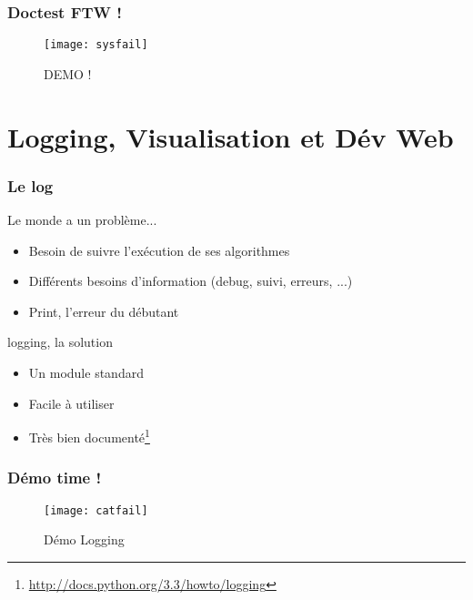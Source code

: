 \documentclass{beamer}
\begin{document}
\begin{frame}
  \frametitle{Doctest FTW !}

  \begin{figure}[!h]
    \centering
    \texttt{[image: sysfail]}
    \caption{DEMO !}
    \label{fig:doctestdemo}
  \end{figure}
\end{frame}


\section{Logging, Visualisation et Dév Web}
\label{sec:libraries}

\begin{frame}
  \frametitle{Le log}

  \begin{block}{Le monde a un problème...}
    \begin{itemize}
    \item Besoin de suivre l'exécution de ses algorithmes
    \item Différents besoins d'information (debug, suivi, erreurs,
      ...)
    \item Print, l'erreur du débutant
    \end{itemize}
  \end{block}

  \begin{block}{logging, la solution}
    \begin{itemize}
    \item Un module standard
    \item Facile à utiliser
    \item Très bien documenté\footnote{\url{http://docs.python.org/3.3/howto/logging}}
    \end{itemize}
  \end{block}
\end{frame}

\begin{frame}
  \frametitle{Démo time !}
  \begin{figure}[!h]
    \centering
    \texttt{[image: catfail]}
    \caption{Démo Logging}
    \label{fig:loggingdemo}
  \end{figure}
\end{frame}
\end{document}
